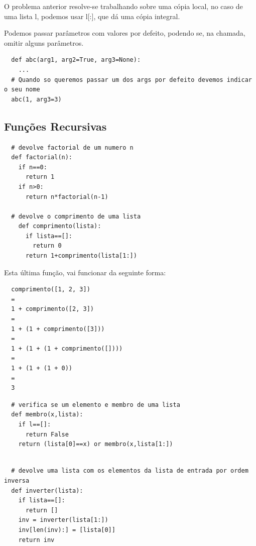 \documentclass{article}
\begin{document}
O problema anterior resolve-se trabalhando sobre uma cópia local,
no caso de uma lista l, podemos usar l[:], que dá uma cópia integral.

\pagebreak

Podemos passar parâmetros com valores por defeito, podendo se, na chamada,
omitir alguns parâmetros.

\begin{lstlisting}
  def abc(arg1, arg2=True, arg3=None):
    ...
  # Quando so queremos passar um dos args por defeito devemos indicar o seu nome
  abc(1, arg3=3)
\end{lstlisting}

\subsection{Funções Recursivas}

\begin{lstlisting}
  # devolve factorial de um numero n
  def factorial(n):
    if n==0:
      return 1
    if n>0:
      return n*factorial(n-1)

  # devolve o comprimento de uma lista
    def comprimento(lista):
      if lista==[]:
        return 0
      return 1+comprimento(lista[1:])
\end{lstlisting}

\begin{flushleft}
  Esta última função, vai funcionar da seguinte forma:
\end{flushleft}

\begin{lstlisting}
  comprimento([1, 2, 3])
  =
  1 + comprimento([2, 3])
  =
  1 + (1 + comprimento([3]))
  =
  1 + (1 + (1 + comprimento([])))
  =
  1 + (1 + (1 + 0))
  =
  3
\end{lstlisting}

\begin{lstlisting}
  # verifica se um elemento e membro de uma lista
  def membro(x,lista):
    if l==[]:
      return False
    return (lista[0]==x) or membro(x,lista[1:])
\end{lstlisting}

\pagebreak

\begin{lstlisting}

  # devolve uma lista com os elementos da lista de entrada por ordem inversa
  def inverter(lista):
    if lista==[]:
      return []
    inv = inverter(lista[1:])
    inv[len(inv):] = [lista[0]]
    return inv
\end{lstlisting}
\end{document}
